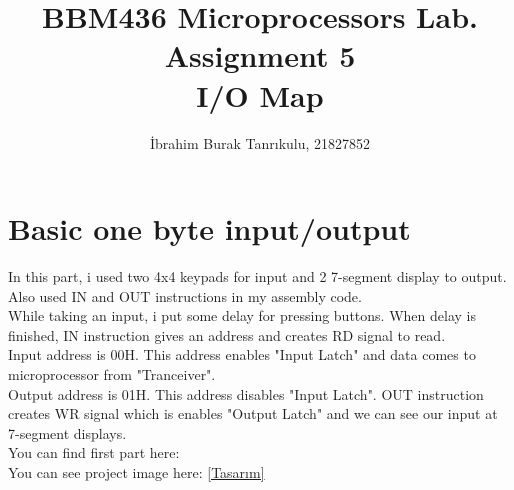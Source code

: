 \documentclass[11pt]{article}
\begin{document}
\author{İbrahim Burak Tanrıkulu, 21827852}
\title{BBM436 Microprocessors Lab.\\Assignment 5\\I/O Map}
\maketitle

\section{Basic one byte input/output}
In this part, i used two 4x4 keypads for input and 2 7-segment display to output. Also used IN and OUT instructions in my assembly code.\\
While taking an input, i put some delay for pressing buttons. When delay is finished, IN instruction gives an address and creates RD signal to read.\\
Input address is 00H. This address enables "Input Latch" and data comes to microprocessor from "Tranceiver".\\
Output address is 01H. This address disables "Input Latch". OUT instruction creates WR signal which is enables "Output Latch" and we can see our input at 7-segment displays.\\
You can find first part here: \\
You can see project image here: \ref{Tasarım}
\end{document}
